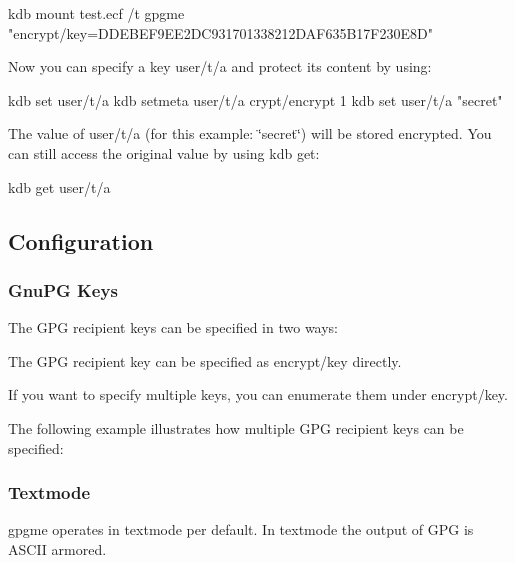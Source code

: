 \begin{DoxyCode}
kdb mount test.ecf /t gpgme "encrypt/key=DDEBEF9EE2DC931701338212DAF635B17F230E8D"
\end{DoxyCode}


Now you can specify a key {\ttfamily user/t/a} and protect its content by using\+:


\begin{DoxyCode}
kdb set user/t/a
kdb setmeta user/t/a crypt/encrypt 1
kdb set user/t/a "secret"
\end{DoxyCode}


The value of {\ttfamily user/t/a} (for this example\+: \char`\"{}secret\char`\"{}) will be stored encrypted. You can still access the original value by using {\ttfamily kdb get}\+:


\begin{DoxyCode}
kdb get user/t/a
\end{DoxyCode}


\subsection*{Configuration}

\subsubsection*{Gnu\+PG Keys}

The G\+PG recipient keys can be specified in two ways\+:


\begin{DoxyEnumerate}
\item The G\+PG recipient key can be specified as {\ttfamily encrypt/key} directly.
\item If you want to specify multiple keys, you can enumerate them under {\ttfamily encrypt/key}.
\end{DoxyEnumerate}

The following example illustrates how multiple G\+PG recipient keys can be specified\+:




\subsubsection*{Textmode}

{\ttfamily gpgme} operates in textmode per default. In textmode the output of G\+PG is A\+S\+C\+II armored.

